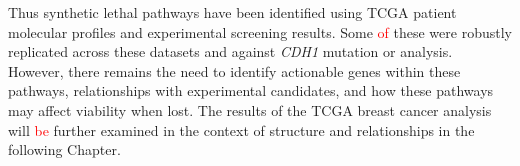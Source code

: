 
Thus \gls{synthetic lethal} \glspl{pathway} have been identified using \gls{TCGA} patient molecular profiles %
and experimental screening results. Some \textcolor{red}{of} these were robustly replicated across these datasets and against \textit{CDH1} \gls{mutation} or  analysis. However, there remains the need to identify actionable genes within these \glspl{pathway}, relationships with experimental candidates, and how these \glspl{pathway} may affect viability when lost. 
The results of the \gls{TCGA} breast cancer analysis will \textcolor{red}{be} further examined in the context of  structure and relationships in the following Chapter.


